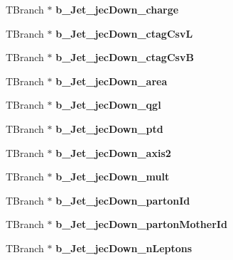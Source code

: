 \begin{DoxyCompactItemize}
\hypertarget{classMiniTree_ab6fb5cd76c1caae789672e94d7aa4af0}{}\label{classMiniTree_ab6fb5cd76c1caae789672e94d7aa4af0} 
T\+Branch $\ast$ {\bfseries b\+\_\+\+Jet\+\_\+jec\+Down\+\_\+charge}
\item 
\hypertarget{classMiniTree_abdda8465da31e8153c0c075dfe13ab9d}{}\label{classMiniTree_abdda8465da31e8153c0c075dfe13ab9d} 
T\+Branch $\ast$ {\bfseries b\+\_\+\+Jet\+\_\+jec\+Down\+\_\+ctag\+CsvL}
\item 
\hypertarget{classMiniTree_a4b3fdd5b5bcdc3556713041790292387}{}\label{classMiniTree_a4b3fdd5b5bcdc3556713041790292387} 
T\+Branch $\ast$ {\bfseries b\+\_\+\+Jet\+\_\+jec\+Down\+\_\+ctag\+CsvB}
\item 
\hypertarget{classMiniTree_a9da678d482cb546cad2d9226c6820d92}{}\label{classMiniTree_a9da678d482cb546cad2d9226c6820d92} 
T\+Branch $\ast$ {\bfseries b\+\_\+\+Jet\+\_\+jec\+Down\+\_\+area}
\item 
\hypertarget{classMiniTree_a7a5b5afa8d48e32e0c6ffd1de79aedea}{}\label{classMiniTree_a7a5b5afa8d48e32e0c6ffd1de79aedea} 
T\+Branch $\ast$ {\bfseries b\+\_\+\+Jet\+\_\+jec\+Down\+\_\+qgl}
\item 
\hypertarget{classMiniTree_afc3f5fdd0a5fb08c2fa4620b12f41835}{}\label{classMiniTree_afc3f5fdd0a5fb08c2fa4620b12f41835} 
T\+Branch $\ast$ {\bfseries b\+\_\+\+Jet\+\_\+jec\+Down\+\_\+ptd}
\item 
\hypertarget{classMiniTree_ad5baeb39903d97013673afd63f1d9cd4}{}\label{classMiniTree_ad5baeb39903d97013673afd63f1d9cd4} 
T\+Branch $\ast$ {\bfseries b\+\_\+\+Jet\+\_\+jec\+Down\+\_\+axis2}
\item 
\hypertarget{classMiniTree_a2236a20a4d6e13407a822ace49171382}{}\label{classMiniTree_a2236a20a4d6e13407a822ace49171382} 
T\+Branch $\ast$ {\bfseries b\+\_\+\+Jet\+\_\+jec\+Down\+\_\+mult}
\item 
\hypertarget{classMiniTree_a8a68659b7bda134cd937113f33fcba9f}{}\label{classMiniTree_a8a68659b7bda134cd937113f33fcba9f} 
T\+Branch $\ast$ {\bfseries b\+\_\+\+Jet\+\_\+jec\+Down\+\_\+parton\+Id}
\item 
\hypertarget{classMiniTree_aafcd223823656e7f7c2b4b18be9e9085}{}\label{classMiniTree_aafcd223823656e7f7c2b4b18be9e9085} 
T\+Branch $\ast$ {\bfseries b\+\_\+\+Jet\+\_\+jec\+Down\+\_\+parton\+Mother\+Id}
\item 
\hypertarget{classMiniTree_af5523327b42674f4dc897beb1ece40f6}{}\label{classMiniTree_af5523327b42674f4dc897beb1ece40f6} 
T\+Branch $\ast$ {\bfseries b\+\_\+\+Jet\+\_\+jec\+Down\+\_\+n\+Leptons}
\item 

\end{DoxyCompactItemize}
